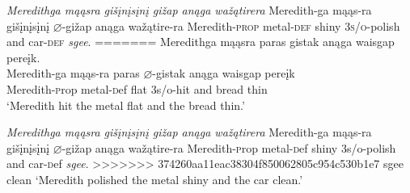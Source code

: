 \documentclass[output=paper]{LSP/langsci}
\begin{document}
\begin{exe}
\begin{exe}
\begin{exe}
\begin{exe}
{\begin{exe}
\begin{exe}
\begin{xlist}
\ex \textit{Meredithga \hspace{1.58em} mąąsra \hspace{.9em} gišįnį{s}įnį \hspace{.1em}gižap  \hspace {2.4em} anąga wažątirera}  \newline Meredith-ga \hspace{1.18em} mąąs-ra \hspace {.5em} gišįnį{s}įnį {$\varnothing$}-gižap \hspace{1.3em} anąga wažątire-ra \newline Meredith-\textsc{prop} metal-\textsc{def} shiny \hspace{1.6em} \textsc{3s/o}-polish and \hspace{1em} car-\textsc{def} \newline\textit{sgee}. \newline
=======
\ex \glll Meredithga m\k{a}\k{a}sra paras gistak an\k{a}ga waisgap pere\k{i}k. \\
Meredith-ga m\k{a}\k{a}s-ra paras $\varnothing$-gistak an\k{a}ga waisgap pere\k{i}k\\
Meredith-{\textsc prop} metal-{\textsc def} flat {\textsc 3s/o}-hit and bread thin\\
\glt `Meredith hit the metal flat and the bread thin.'

\ex \textit{Meredithga \hspace{1.58em} m\k{a}\k{a}sra \hspace{.9em} gi\v{s}\k{i}n\k{i}{s}\k{i}n\k{i} \hspace{.1em}gi\v{z}ap  \hspace {2.4em} an\k{a}ga wa\v{z}\k{a}tirera}  \newline Meredith-ga \hspace{1.18em} m\k{a}\k{a}s-ra \hspace {.5em} gi\v{s}\k{i}n\k{i}{s}\k{i}n\k{i} $\varnothing$-gi\v{z}ap \hspace{1.3em} an\k{a}ga wa\v{z}\k{a}tire-ra \newline Meredith-{\textsc prop} metal-{\textsc def} shiny \hspace{1.6em} {\textsc 3s/o}-polish and \hspace{1em} car-{\textsc def} \newline\textit{sgee}. \newline
>>>>>>> 374260aa11eac38304f850062805c954c530b1e7
sgee \newline
clean \newline
`Meredith polished the metal shiny and the car clean.'

\end{xlist}
\end{exe}
 

\end{exe}}
\end{exe}
\end{exe}
\end{exe}
\end{exe}
\end{document}
